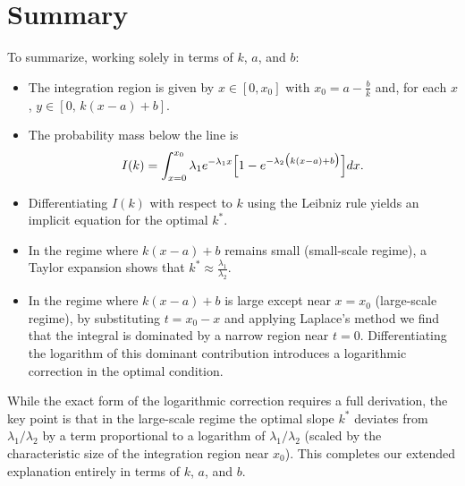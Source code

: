 \section{Summary}

To summarize, working solely in terms of \(k\), \(a\), and \(b\):
\begin{itemize}
  \item The integration region is given by \(x\in[0, x_0]\) with \(x_0 = a-\frac{b}{k}\) and, for each \(x\), \(y\in[0,\,k(x-a)+b]\).
  \item The probability mass below the line is 
  \[
  I(k)=\int_{x=0}^{x_0}\lambda_1e^{-\lambda_1x}\Bigl[1-e^{-\lambda_2\bigl(k(x-a)+b\bigr)}\Bigr]dx.
  \]
  \item Differentiating \(I(k)\) with respect to \(k\) using the Leibniz rule yields an implicit equation for the optimal \(k^*\).
  \item In the regime where \(k(x-a)+b\) remains small (small-scale regime), a Taylor expansion shows that \(k^*\approx\frac{\lambda_1}{\lambda_2}\).
  \item In the regime where \(k(x-a)+b\) is large except near \(x=x_0\) (large-scale regime), by substituting \(t=x_0-x\) and applying Laplace's method we find that the integral is dominated by a narrow region near \(t=0\). Differentiating the logarithm of this dominant contribution introduces a logarithmic correction in the optimal condition.
\end{itemize}

While the exact form of the logarithmic correction requires a full derivation, the key point is that in the large-scale regime the optimal slope \(k^*\) deviates from \(\lambda_1/\lambda_2\) by a term proportional to a logarithm of \(\lambda_1/\lambda_2\) (scaled by the characteristic size of the integration region near \(x_0\)). This completes our extended explanation entirely in terms of \(k\), \(a\), and \(b\).